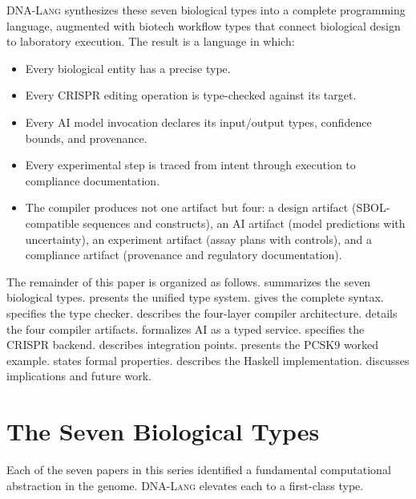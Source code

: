 \documentclass[12pt,a4paper]{article}
\newcommand{\DNALang}{\textsc{DNA-Lang}}
\begin{document}
\DNALang{} synthesizes these seven biological types into a complete programming language, augmented with biotech workflow types that connect biological design to laboratory execution. The result is a language in which:

\begin{itemize}
    \item Every biological entity has a precise type.
    \item Every CRISPR editing operation is type-checked against its target.
    \item Every AI model invocation declares its input/output types, confidence bounds, and provenance.
    \item Every experimental step is traced from intent through execution to compliance documentation.
    \item The compiler produces not one artifact but four: a design artifact (SBOL-compatible sequences and constructs), an AI artifact (model predictions with uncertainty), an experiment artifact (assay plans with controls), and a compliance artifact (provenance and regulatory documentation).
\end{itemize}

The remainder of this paper is organized as follows.  summarizes the seven biological types.  presents the unified type system.  gives the complete syntax.  specifies the type checker.  describes the four-layer compiler architecture.  details the four compiler artifacts.  formalizes AI as a typed service.  specifies the CRISPR backend.  describes integration points.  presents the PCSK9 worked example.  states formal properties.  describes the Haskell implementation.  discusses implications and future work.


\section{The Seven Biological Types}
\label{sec:seven-types}

Each of the seven papers in this series identified a fundamental computational abstraction in the genome. \DNALang{} elevates each to a first-class type.
\end{document}
